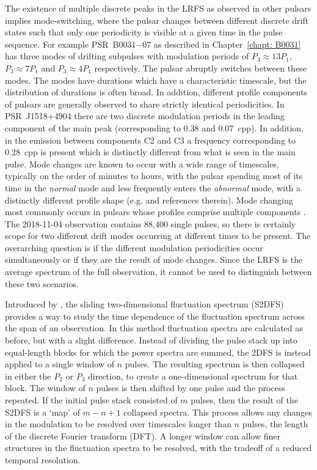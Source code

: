 The existence of multiple discrete peaks in the LRFS as observed in other pulsars implies mode-switching, where the pulsar changes between different discrete drift states such that only one periodicity is visible at a given time in the pulse sequence. For example PSR~B0031$-$07 as described in Chapter~\ref{chapt: B0031} has three modes of drifting subpulses with modulation periods of $P_3 \approx 13P_1$, $P_3\approx 7P_1$ and $P_3 \approx 4P_1$ respectively. The pulsar abruptly switches between these modes. The modes have durations which have a characteristic timescale, but the distribution of durations is often broad. In addition, different profile components of pulsars are generally observed to share strictly identical periodicities. In PSR~J1518+4904 there are two discrete modulation periods in the leading component of the main peak (corresponding to 0.38 and 0.07~cpp). In addition, in the emission between components C2 and C3 a frequency corresponding to 0.28~cpp is present which is distinctly different from what is seen in the main pulse. Mode changes are known to occur with a wide range of timescales, typically on the order of minutes to hours, with the pulsar spending most of its time in the \textit{normal} mode and less frequently enters the \textit{abnormal} mode, with a distinctly different profile shape (e.g. \citealt{Sxxx2018} and references therein). Mode changing most commonly occurs in pulsars whose profiles comprise multiple components \citep{Rxxx1986}. The 2018-11-04 observation contains 88,400 single pulses, so there is certainly scope for two different drift modes occurring at different times to be present. The overarching question is if the different modulation periodicities occur simultaneously or if they are the result of mode changes. Since the LRFS is the average spectrum of the full observation, it cannot be used to distinguish between these two scenarios. 

Introduced by \citet{SSW+2009}, the sliding two-dimensional fluctuation spectrum (S2DFS) provides a way to study the time dependence of the fluctuation spectrum across the span of an observation. In this method fluctuation spectra are calculated as before, but with a slight difference. Instead of dividing the pulse stack up into equal-length blocks for which the power spectra are summed, the 2DFS is instead applied to a single window of $n$ pulses. The resulting spectrum is then collapsed in either the $P_2$ or $P_3$ direction, to create a one-dimensional spectrum for that block. The window of $n$ pulses is then shifted by one pulse and the process repeated. If the initial pulse stack consisted of $m$ pulses, then the result of the S2DFS is a `map' of $m-n+1$ collapsed spectra. This process allows any changes in the modulation to be resolved over timescales longer than $n$ pulses, the length of the discrete Fourier transform (DFT). A longer window can allow finer structures in the fluctuation spectra to be resolved, with the tradeoff of a reduced temporal resolution.

